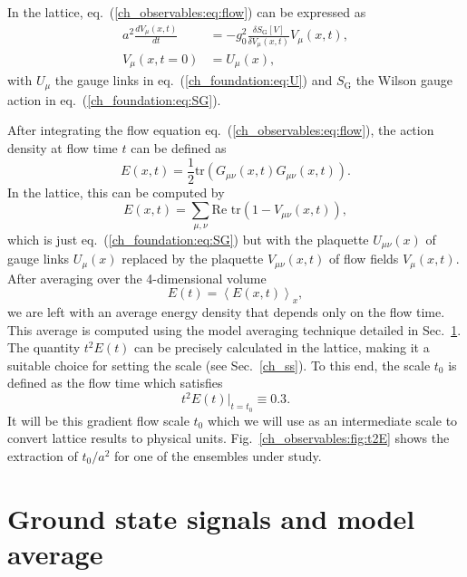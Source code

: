 In the lattice, eq.~(\ref{ch_observables:eq:flow}) can be expressed as 
\begin{align}
a^2\frac{dV_{\mu}(x,t)}{dt}&=-g_0^2\frac{\delta S_{\textrm{G}}[V]}{\delta V_{\mu}(x,t)}V_{\mu}(x,t),\\
V_{\mu}(x,t=0)&=U_{\mu}(x),
\end{align}
with $U_{\mu}$ the gauge links in eq.~(\ref{ch_foundation:eq:U}) and $S_{\textrm{G}}$ the Wilson gauge action in eq.~(\ref{ch_foundation:eq:SG}).

After integrating the flow equation eq.~(\ref{ch_observables:eq:flow}), the action density at flow time $t$ can be defined as
\begin{equation}
E(x,t)=\frac{1}{2}{\textrm{tr}}\left({G}_{\mu\nu}(x,t){G}_{\mu\nu}(x,t)\right).
\end{equation}
In the lattice, this can be computed by
\begin{equation}
\label{ch_observables:eq:E}
E(x,t)=\sum_{\mu,\nu}\textrm{Re tr}\left(1-V_{\mu\nu}(x,t)\right),
\end{equation}
which is just eq.~(\ref{ch_foundation:eq:SG}) but with the plaquette $U_{\mu\nu}(x)$ of gauge links $U_{\mu}(x)$ replaced by the plaquette $V_{\mu\nu}(x,t)$ of flow fields $V_{\mu}(x,t)$. After averaging over the 4-dimensional volume
\begin{equation}
E(t)=\left<E(x,t)\right>_x,
\end{equation}
we are left with an average energy density that depends only on the flow time. This average is computed using the model averaging technique detailed in Sec.~\ref{ch_observables:sec:MA}. The quantity $t^2E(t)$ can be precisely calculated in the lattice, making it a suitable choice for setting the scale (see Sec.~\ref{ch_ss}). To this end, the scale $t_0$ is defined as the flow time which satisfies
\begin{equation}
\label{ch_observables:eq:t0}
t^2E(t)|_{t=t_0}\equiv0.3.
\end{equation}
It will be this gradient flow scale $t_0$ which we will use as an intermediate scale to convert lattice results to physical units. Fig.~\ref{ch_observables:fig:t2E} shows the extraction of $t_0/a^2$ for one of the ensembles under study.



\section{Ground state signals and model average}
\label{ch_observables:sec:MA}

